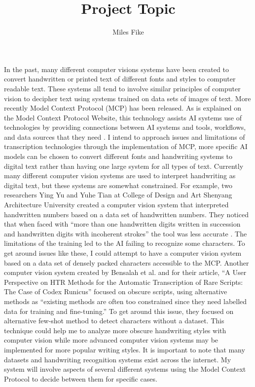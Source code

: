 \documentclass[12pt]{article}
\title{\textbf{Project Topic}}
\author{Miles Fike}
\begin{document}
\maketitle

In the past, many different computer visions systems have been created to convert handwritten or printed text of different fonts and styles to computer readable text. These systems all tend to involve similar principles of computer vision to decipher text using systems trained on data sets of images of text. More recently Model Context Protocol (MCP) has been released. As is explained on the Model Context Protocol Website, this technology assists AI systems use of technologies by providing connections between AI systems and tools, workflows, and data sources that they need \cite{modelContextProtocol/getting-started/intro}. I intend to approach issues and limitations of transcription technologies through the implementation of MCP, more specific AI models can be chosen to convert different fonts and handwriting systems to digital text rather than having one large system for all types of text. 
\newline
Currently many different computer vision systems are used to interpret handwriting as digital text, but these systems are somewhat constrained.  For example, two researchers Ying Yu and Yuhe Tian at College of Design and Art Shenyang Architecture University created a computer vision system that interpreted handwritten numbers based on a data set of handwritten numbers. They noticed that when faced with “more than one handwritten digits written in succession and handwritten digits with incoherent strokes” the tool was less accurate \cite{10.1145/3727648.3727679}. The limitations of the training led to the AI failing to recognize some characters. To get around issues like these, I could attempt to have a computer vision system based on a data set of densely packed characters accessible to the MCP. Another computer vision system created by Bensalah et al. and for their article, “A User Perspective on HTR Methods for the Automatic Transcription of Rare Scripts: The Case of Codex Runicus” focused on obscure scripts, using alternative methods as “existing methods are often too constrained since they need labelled data for training and fine-tuning.” \cite{10.1145/3519306}  To get around this issue, they focused on alternative few-shot method to detect characters without a dataset. This technique could help me to analyze more obscure handwriting styles with computer vision while more advanced computer vision systems may be implemented for more popular writing styles. It is important to note that many datasets and handwriting recognition systems exist across the internet. My system will involve aspects of several different systems using the Model Context Protocol to decide between them for specific cases.
\newpage
\end{document}
